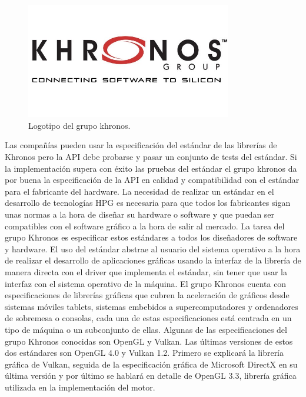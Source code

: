 \documentclass[a4paper, 17pt]{book}
\begin{document}
\begin{figure}[hbt!]
    \centering
    \includegraphics[width=9cm, keepaspectratio]{img/khronos.jpg}
    \caption{Logotipo del grupo khronos.}
    \label{figura:khronos}
\end{figure}

Las compañías pueden usar la especificación del estándar de las librerías de Khronos pero la API debe probarse y pasar un
conjunto de tests del estándar. Si la implementación supera con éxito las pruebas del estándar el grupo khronos da por
buena la especificación de la API en calidad y compatibilidad con el estándar para el fabricante del hardware.
La necesidad de realizar un estándar en el desarrollo de tecnologías HPG es necesaria para que todos los fabricantes
sigan unas normas a la hora de diseñar su hardware o software y que puedan ser compatibles con el software gráfico a la
hora de salir al mercado. 
\bigbreak
La tarea del grupo Khronos es especificar estos estándares a todos los diseñadores de software y hardware. El uso del
estándar abstrae al usuario del sistema operativo a la hora de realizar el desarrollo de aplicaciones gráficas usando
la interfaz de la librería de manera directa con el driver que implementa el estándar, sin tener que usar la interfaz
con el sistema operativo de la máquina. 
\bigbreak
El grupo Khronos cuenta con especificaciones de librerías gráficas que cubren la aceleración de gráficos desde sistemas
móviles tablets, sistemas embebidos a supercomputadores y ordenadores de sobremesa o consolas, cada una de estas
especificaciones está centrada en un tipo de máquina o un subconjunto de ellas. Algunas de las especificaciones del grupo
Khronos conocidas son OpenGL y Vulkan. Las últimas versiones de estos dos estándares son OpenGL 4.0 y Vulkan 1.2. 
\bigbreak
Primero se explicará la librería gráfica de Vulkan, seguida de la especificación gráfica de Microsoft DirectX en su última
versión y por último se hablará en detalle de OpenGL 3.3, librería gráfica utilizada en la implementación del motor.
\end{document}
